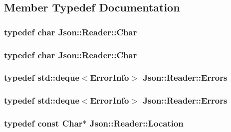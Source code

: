 \subsection{Member Typedef Documentation}
\hypertarget{classJson_1_1Reader_a3eec9118f3e9a672ba8348c3a79d0f45}{
\subsubsection[{Char}]{\setlength{\rightskip}{0pt plus 5cm}typedef char {\bf Json\-::\-Reader\-::\-Char}}}\label{d1/d62/classJson_1_1Reader_a3eec9118f3e9a672ba8348c3a79d0f45}
\hypertarget{classJson_1_1Reader_a3eec9118f3e9a672ba8348c3a79d0f45}{
\subsubsection[{Char}]{\setlength{\rightskip}{0pt plus 5cm}typedef char {\bf Json\-::\-Reader\-::\-Char}}}\label{d1/d62/classJson_1_1Reader_a3eec9118f3e9a672ba8348c3a79d0f45}
\hypertarget{classJson_1_1Reader_aae51e8f5bab3f067261c842a3ef858e5}{
\subsubsection[{Errors}]{\setlength{\rightskip}{0pt plus 5cm}typedef std\-::deque$<${\bf Error\-Info}$>$ {\bf Json\-::\-Reader\-::\-Errors}\hspace{0.3cm}{\ttfamily [private]}}}\label{d1/d62/classJson_1_1Reader_aae51e8f5bab3f067261c842a3ef858e5}
\hypertarget{classJson_1_1Reader_aae51e8f5bab3f067261c842a3ef858e5}{
\subsubsection[{Errors}]{\setlength{\rightskip}{0pt plus 5cm}typedef std\-::deque$<${\bf Error\-Info}$>$ {\bf Json\-::\-Reader\-::\-Errors}\hspace{0.3cm}{\ttfamily [private]}}}\label{d1/d62/classJson_1_1Reader_aae51e8f5bab3f067261c842a3ef858e5}
\hypertarget{classJson_1_1Reader_a46795b5b272bf79a7730e406cb96375a}{
\subsubsection[{Location}]{\setlength{\rightskip}{0pt plus 5cm}typedef const {\bf Char}$\ast$ {\bf Json\-::\-Reader\-::\-Location}}}\label{d1/d62/classJson_1_1Reader_a46795b5b272bf79a7730e406cb96375a}
